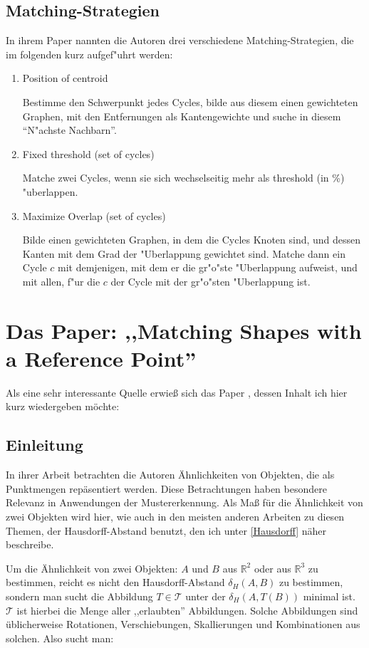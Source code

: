 \subsection{Matching-Strategien}\label{MatchSchwer}
In ihrem Paper nannten die Autoren drei verschiedene Matching-Strategien, die im folgenden kurz aufgef"uhrt werden:
\begin{enumerate}
\item Position of centroid

Bestimme den Schwerpunkt jedes Cycles,  bilde aus diesem einen gewichteten Graphen, mit den Entfernungen als Kantengewichte und suche in diesem "`N"achste Nachbarn"'.
\item Fixed threshold (set of cycles)

Matche zwei Cycles, wenn sie sich wechselseitig  mehr als threshold (in \%) "uberlappen.

\item Maximize Overlap (set of cycles)

Bilde einen gewichteten Graphen, in dem die Cycles Knoten sind, und dessen Kanten mit dem Grad der "Uberlappung gewichtet sind. Matche dann ein Cycle $c$ mit demjenigen, mit dem er die gr"o"ste "Uberlappung aufweist, und mit allen, f"ur die $c$ der Cycle mit der gr"o"sten "Uberlappung ist.
\end{enumerate} 

\section[Matching Shapes with a Reference Point]{Das Paper: ,,Matching Shapes with a Reference Point'' }\label{AARR}

Als eine sehr interessante Quelle erwieß sich das Paper \cite{AAR}, dessen Inhalt ich hier kurz wiedergeben möchte:

\subsection{Einleitung}

In ihrer Arbeit betrachten die Autoren Ähnlichkeiten von Objekten, die als Punktmengen repäsentiert werden. Diese Betrachtungen haben besondere Relevanz in Anwendungen der Mustererkennung. Als Maß für die Ähnlichkeit von zwei Objekten wird hier, wie auch in den meisten anderen Arbeiten zu diesen Themen, der Hausdorff-Abstand benutzt, den ich unter \ref{Hausdorff} näher beschreibe.

Um die Ähnlichkeit von zwei Objekten: $A$ und $B$ aus $\mathbb{R}^2$ oder aus $\mathbb{R}^3$ zu bestimmen, reicht es nicht den Hausdorff-Abstand $\delta_H(A,B)$ zu bestimmen, sondern man sucht die Abbildung $T\in\mathcal{T}$ unter der $\delta_H(A,T(B))$ minimal ist. $\mathcal{T}$ ist hierbei die Menge aller ,,erlaubten'' Abbildungen. Solche Abbildungen sind üblicherweise Rotationen, Verschiebungen, Skallierungen und Kombinationen aus solchen. Also sucht man:

